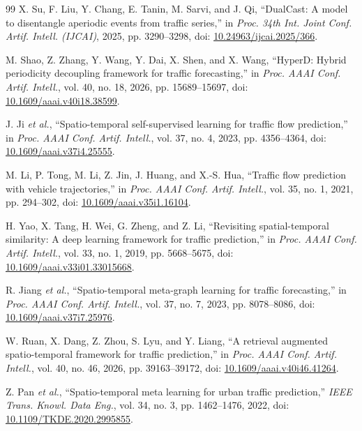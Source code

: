 \begin{thebibliography}{99}
X. Su, F. Liu, Y. Chang, E. Tanin, M. Sarvi, and J. Qi, ``DualCast: A model to disentangle aperiodic events from traffic series,'' in \emph{Proc. 34th Int. Joint Conf. Artif. Intell. (IJCAI)}, 2025, pp. 3290--3298, doi: \href{https://doi.org/10.24963/ijcai.2025/366}{10.24963/ijcai.2025/366}.

M. Shao, Z. Zhang, Y. Wang, Y. Dai, X. Shen, and X. Wang, ``HyperD: Hybrid periodicity decoupling framework for traffic forecasting,'' in \emph{Proc. AAAI Conf. Artif. Intell.}, vol. 40, no. 18, 2026, pp. 15689--15697, doi: \href{https://doi.org/10.1609/aaai.v40i18.38599}{10.1609/aaai.v40i18.38599}.

J. Ji \emph{et al.}, ``Spatio-temporal self-supervised learning for traffic flow prediction,'' in \emph{Proc. AAAI Conf. Artif. Intell.}, vol. 37, no. 4, 2023, pp. 4356--4364, doi: \href{https://doi.org/10.1609/aaai.v37i4.25555}{10.1609/aaai.v37i4.25555}.

M. Li, P. Tong, M. Li, Z. Jin, J. Huang, and X.-S. Hua, ``Traffic flow prediction with vehicle trajectories,'' in \emph{Proc. AAAI Conf. Artif. Intell.}, vol. 35, no. 1, 2021, pp. 294--302, doi: \href{https://doi.org/10.1609/aaai.v35i1.16104}{10.1609/aaai.v35i1.16104}.

H. Yao, X. Tang, H. Wei, G. Zheng, and Z. Li, ``Revisiting spatial-temporal similarity: A deep learning framework for traffic prediction,'' in \emph{Proc. AAAI Conf. Artif. Intell.}, vol. 33, no. 1, 2019, pp. 5668--5675, doi: \href{https://doi.org/10.1609/aaai.v33i01.33015668}{10.1609/aaai.v33i01.33015668}.

R. Jiang \emph{et al.}, ``Spatio-temporal meta-graph learning for traffic forecasting,'' in \emph{Proc. AAAI Conf. Artif. Intell.}, vol. 37, no. 7, 2023, pp. 8078--8086, doi: \href{https://doi.org/10.1609/aaai.v37i7.25976}{10.1609/aaai.v37i7.25976}.

W. Ruan, X. Dang, Z. Zhou, S. Lyu, and Y. Liang, ``A retrieval augmented spatio-temporal framework for traffic prediction,'' in \emph{Proc. AAAI Conf. Artif. Intell.}, vol. 40, no. 46, 2026, pp. 39163--39172, doi: \href{https://doi.org/10.1609/aaai.v40i46.41264}{10.1609/aaai.v40i46.41264}.

Z. Pan \emph{et al.}, ``Spatio-temporal meta learning for urban traffic prediction,'' \emph{IEEE Trans. Knowl. Data Eng.}, vol. 34, no. 3, pp. 1462--1476, 2022, doi: \href{https://doi.org/10.1109/TKDE.2020.2995855}{10.1109/TKDE.2020.2995855}.


\end{thebibliography}

